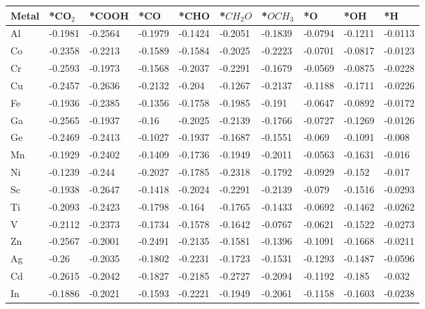 \begin{table}[h]
  \centering
  {\fontsize{6}{12}\selectfont
  \begin{tabular}{*{10}{l}}
      \hline
      Metal & *CO$_2$ & *COOH & *CO & *CHO & *$CH_2O$ & *$OCH_3$ & *O & *OH & *H                   \\
      \hline
      Al & -0.1981 & -0.2564 & -0.1979 & -0.1424 & -0.2051 & -0.1839 & -0.0794 & -0.1211 & -0.0113 \\
      Co & -0.2358 & -0.2213 & -0.1589 & -0.1584 & -0.2025 & -0.2223 & -0.0701 & -0.0817 & -0.0123 \\
      Cr & -0.2593 & -0.1973 & -0.1568 & -0.2037 & -0.2291 & -0.1679 & -0.0569 & -0.0875 & -0.0228 \\
      Cu & -0.2457 & -0.2636 & -0.2132 & -0.204  & -0.1267 & -0.2137 & -0.1188 & -0.1711 & -0.0226 \\
      Fe & -0.1936 & -0.2385 & -0.1356 & -0.1758 & -0.1985 & -0.191  & -0.0647 & -0.0892 & -0.0172 \\
      Ga & -0.2565 & -0.1937 & -0.16   & -0.2025 & -0.2139 & -0.1766 & -0.0727 & -0.1269 & -0.0126 \\
      Ge & -0.2469 & -0.2413 & -0.1027 & -0.1937 & -0.1687 & -0.1551 & -0.069  & -0.1091 & -0.008  \\
      Mn & -0.1929 & -0.2402 & -0.1409 & -0.1736 & -0.1949 & -0.2011 & -0.0563 & -0.1631 & -0.016  \\
      Ni & -0.1239 & -0.244  & -0.2027 & -0.1785 & -0.2318 & -0.1792 & -0.0929 & -0.152  & -0.017  \\
      Sc & -0.1938 & -0.2647 & -0.1418 & -0.2024 & -0.2291 & -0.2139 & -0.079  & -0.1516 & -0.0293 \\
      Ti & -0.2093 & -0.2423 & -0.1798 & -0.164  & -0.1765 & -0.1433 & -0.0692 & -0.1462 & -0.0262 \\
      V  & -0.2112 & -0.2373 & -0.1734 & -0.1578 & -0.1642 & -0.0767 & -0.0621 & -0.1522 & -0.0273 \\
      Zn & -0.2567 & -0.2001 & -0.2491 & -0.2135 & -0.1581 & -0.1396 & -0.1091 & -0.1668 & -0.0211 \\
      Ag & -0.26   & -0.2035 & -0.1802 & -0.2231 & -0.1723 & -0.1531 & -0.1293 & -0.1487 & -0.0596 \\
      Cd & -0.2615 & -0.2042 & -0.1827 & -0.2185 & -0.2727 & -0.2094 & -0.1192 & -0.185  & -0.032  \\
      In & -0.1886 & -0.2021 & -0.1593 & -0.2221 & -0.1949 & -0.2061 & -0.1158 & -0.1603 & -0.0238 \\

\end{tabular}}
\end{table}
